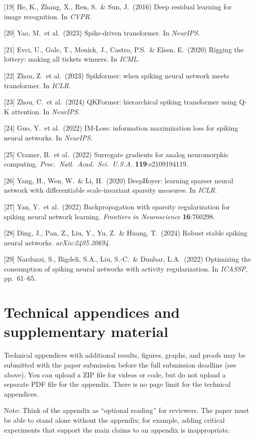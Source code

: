 \documentclass{article}
\begin{document}
[19] He, K., Zhang, X., Ren, S.\ \& Sun, J.\ (2016) Deep residual learning for image recognition. In {\it CVPR}.

[20] Yao, M.\ et al.\ (2023) Spike-driven transformer. In {\it NeurIPS}.

[21] Evci, U., Gale, T., Menick, J., Castro, P.S.\ \& Elsen, E.\ (2020) Rigging the lottery: making all tickets winners. In {\it ICML}.

[22] Zhou, Z.\ et al.\ (2023) Spikformer: when spiking neural network meets transformer. In {\it ICLR}.

[23] Zhou, C.\ et al.\ (2024) QKFormer: hierarchical spiking transformer using Q-K attention. In {\it NeurIPS}.

[24] Guo, Y.\ et al.\ (2022) IM-Loss: information maximization loss for spiking neural networks. In {\it NeurIPS}.

[25] Cramer, B.\ et al.\ (2022) Surrogate gradients for analog neuromorphic computing. {\it Proc.\ Natl.\ Acad.\ Sci.\ U.S.A.} {\bf 119}:e2109194119.

[26] Yang, H., Wen, W.\ \& Li, H.\ (2020) DeepHoyer: learning sparser neural network with differentiable scale-invariant sparsity measures. In {\it ICLR}.

[27] Yan, Y.\ et al.\ (2022) Backpropagation with sparsity regularization for spiking neural network learning. {\it Frontiers in Neuroscience} {\bf 16}:760298.

[28] Ding, J., Pan, Z., Liu, Y., Yu, Z.\ \& Huang, T.\ (2024) Robust stable spiking neural networks. {\it arXiv:2405.20694}.

[29] Narduzzi, S., Bigdeli, S.A., Liu, S.-C.\ \& Dunbar, L.A.\ (2022) Optimizing the consumption of spiking neural networks with activity regularization. In {\it ICASSP}, pp.\ 61--65.

\fi



\appendix

\section{Technical appendices and supplementary material}
Technical appendices with additional results, figures, graphs, and proofs may be submitted with the paper submission before the full submission deadline (see above). You can upload a ZIP file for videos or code, but do not upload a separate PDF file for the appendix. There is no page limit for the technical appendices. 

Note: Think of the appendix as ``optional reading'' for reviewers. The paper must be able to stand alone without the appendix; for example, adding critical experiments that support the main claims to an appendix is inappropriate. 


\newpage

\end{document}
